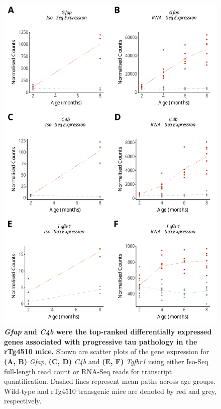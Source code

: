 \begin{figure}[h]
	\begin{center}
		\includegraphics[page=1,scale = 0.55]{Figures/WholeDifferentialAnalysis.pdf}
	\end{center}
	\captionsetup{width=0.95\textwidth}
	\caption[Top-ranked differentially expressed genes associated with rTg4510 genotype]%
	{\textbf{\textit{Gfap} and \textit{C4b} were the top-ranked differentially expressed genes associated with progressive tau pathology in the rTg4510 mice.} Shown are scatter plots of the gene expression for \textbf{(A, B)} \textit{Gfap}, \textbf{(C, D)} \textit{C4b} and \textbf{(E, F)} \textit{Tgfbr1} using either Iso-Seq full-length read count or RNA-Seq reads for transcript quantification. Dashed lines represent mean paths across age groups. Wild-type and rTg4510 transgenic mice are denoted by red and grey, respectively.}   
	\label{fig:whole_dea}
\end{figure}

